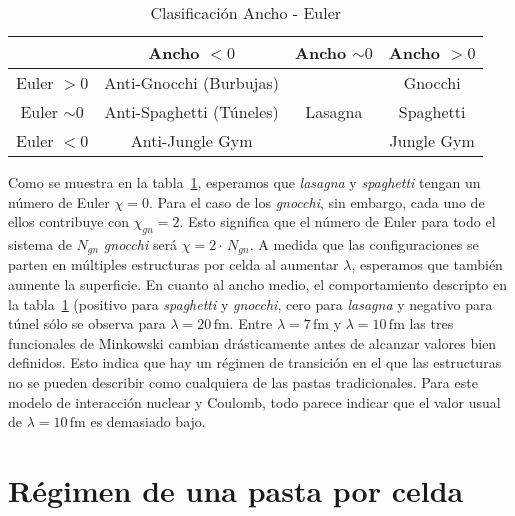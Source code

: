 \begin{table}[ht] \centering
\caption{Clasificación Ancho - Euler}
\begin{tabular}{c|| c | c | c} \hline & Ancho $<0$ & Ancho
$\sim 0$ & Ancho $>0$ \\
               
\hline\hline Euler $>0$ & Anti-Gnocchi (Burbujas) & & Gnocchi \\

Euler $\sim0$ & Anti-Spaghetti (Túneles) & Lasagna & Spaghetti \\

Euler $<0$ & Anti-Jungle Gym & & Jungle Gym \\ [1ex] \hline
\end{tabular}
\label{tab:mink}
\end{table}

Como se muestra en la tabla~\ref{tab:mink}, esperamos que \emph{lasagna} y \emph{spaghetti} tengan un número de Euler $\chi=0$.
Para el caso de los \emph{gnocchi}, sin embargo, cada uno de ellos contribuye con $\chi_{gn}=2$.
Esto significa que el número de Euler para todo el sistema de $N_{gn}$ \emph{gnocchi} será $\chi=2\cdot\,N_{gn}$.
A medida que las configuraciones se parten en múltiples estructuras por celda al aumentar $\lambda$, esperamos que también aumente la superficie.
En cuanto al ancho medio, el comportamiento descripto en la tabla~\ref{tab:mink} (positivo para \emph{spaghetti} y \emph{gnocchi}, cero para \emph{lasagna} y negativo para túnel sólo se observa para $\lambda=20\,\text{fm}$.
Entre $\lambda=7\,\text{fm}$ y $\lambda=10\,\text{fm}$ las tres funcionales de Minkowski cambian drásticamente antes de alcanzar valores bien definidos.
Esto indica que hay un régimen de transición en el que las estructuras no se pueden describir como cualquiera de las pastas tradicionales.
Para este modelo de interacción nuclear y Coulomb, todo parece indicar que el valor usual de $\lambda=10\,\text{fm}$ es demasiado bajo.


\section{Régimen de una pasta por celda} \label{pasta-bup}

